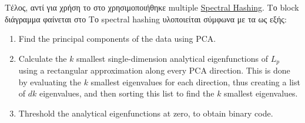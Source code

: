 Τέλος, αντί για χρήση \lsh{} το \citeyear{park2015query} στο \cite{park2015query} χρησιμοποιήθηκε multiple \href{https://en.wikipedia.org/wiki/Spectral_Hash}{Spectral Hashing}.
Το block διάγραμμα φαίνεται στο 
Το spectral hashing υλοποιείται σύμφωνα με τα \cite{weiss2009spectral,weiss2009spectral-blog} ως εξής:
\begin{enumerate}
\item Find the principal components of the data using PCA.
\item Calculate the $k$ smallest single-dimension analytical eigenfunctions of $L_p$ using a rectangular approximation along every PCA direction.
This is done by evaluating the $k$ smallest eigenvalues for each direction, thus creating a list of $dk$ eigenvalues, and then sorting this list to find the $k$ smallest eigenvalues.
\item Threshold the analytical eigenfunctions at zero, to obtain binary code.
\end{enumerate}

\undef{\ls}
\undef{\lsh}
\FloatBarrier
